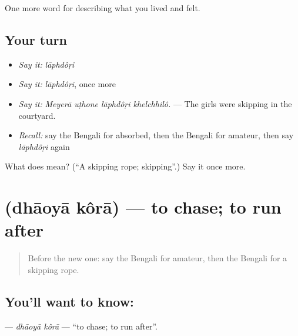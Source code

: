 \begin{grammarlens}[title={What you've built}]
One more word for describing what you lived and felt.
\end{grammarlens}

\subsection*{Your turn}
\begin{itemize}
\raggedright
  \item \emph{Say it:} \emph{lāphdôṛi}
  \item \emph{Say it:} \emph{lāphdôṛi}, once more
  \item \emph{Say it:} \emph{Meyerā uṭhone lāphdôṛi khelchhilô.} — The girls were skipping in the courtyard.
  \item \emph{Recall:} say the Bengali for absorbed, then the Bengali for amateur, then say \emph{lāphdôṛi} again
\end{itemize}

\begin{tcolorbox}[breakable,colback=teal!4,colframe=teal!35!black,title={Before you move on}]
What does  mean? (\textquotedblleft{}A skipping rope; skipping\textquotedblright{}.) Say it once more.
\end{tcolorbox}
\section[\texorpdfstring{\bn{ধাওয়া} \bn{করা} (dhāoyā kôrā)}{ধাওয়া করা (dhāoyā kôrā)}]{  (dhāoyā kôrā) — to chase; to run after}

\label{lesson:BN-C517-dhaoya-kora}



\begin{quote}
Before the new one: say the Bengali for amateur, then the Bengali for a skipping rope.
\end{quote}

\subsection*{You'll want to know:  }
\textbf{ } — \emph{dhāoyā kôrā} — \textquotedblleft{}to chase; to run after\textquotedblright{}.

\begin{quote}
   
\end{quote}

